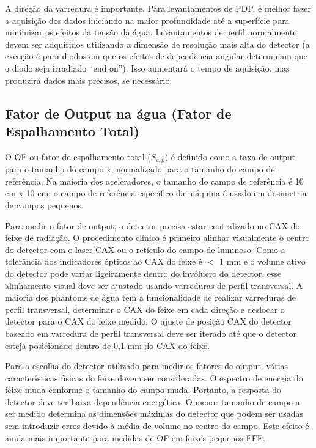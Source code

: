 \documentclass[11pt,a4paper]{article}
\begin{document}
	A direção da varredura é importante. Para levantamentos de PDP, é melhor fazer a aquisição dos dados iniciando na maior profundidade até a superfície para minimizar os efeitos da tensão da água. Levantamentos de perfil normalmente devem ser adquiridos utilizando a dimensão de resolução mais alta do detector (a exceção é para diodos em que os efeitos de dependência angular determinam que o diodo seja irradiado “end on”). Isso aumentará o tempo de aquisição, mas produzirá dados mais precisos, se necessário.

\subsection*{Fator de Output na água (Fator de Espalhamento Total)}

	O OF ou fator de espalhamento total ($S_{c,p}$) é definido como a taxa de output para o tamanho do campo x, normalizado para o tamanho do campo de referência. Na maioria dos aceleradores, o tamanho do campo de referência é 10 cm x 10 cm; o campo de referência específico da máquina é usado em dosimetria de campos pequenos.

	Para medir o fator de output, o detector precisa estar centralizado no CAX do feixe de radiação. O procedimento clínico é primeiro alinhar visualmente o centro do detector com o  laser CAX ou o retículo do campo de luminoso. Como a tolerância dos indicadores ópticos  ao CAX do feixe é $<$ 1 mm e o volume ativo do detector pode variar ligeiramente dentro do invólucro do detector, esse alinhamento visual deve ser ajustado usando varreduras de perfil transversal. A maioria dos phantoms de água tem a funcionalidade de realizar varreduras de perfil transversal, determinar o CAX do feixe em cada direção e deslocar o detector para o CAX do feixe medido. O ajuste de posição CAX do detector baseado em varredura de perfil transversal deve ser iterado até que o detector esteja posicionado dentro de 0,1 mm do CAX do feixe.

	Para a escolha do detector utilizado para medir os fatores de output, várias características físicas do feixe devem ser consideradas. O espectro de energia do feixe muda conforme o tamanho do campo muda. Portanto, a resposta do detector deve ter baixa dependência energética. O menor tamanho de campo a ser medido determina as dimensões máximas do detector que podem ser usadas sem introduzir erros devido à média de volume no centro do campo. Este efeito é ainda mais importante para medidas de OF em feixes pequenos FFF.
\end{document}
